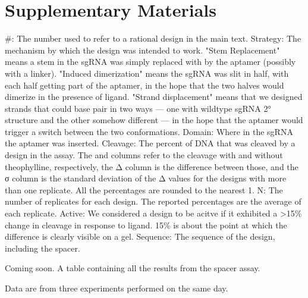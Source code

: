 \documentclass[10pt,oneside]{article}
\begin{document}
\section{Supplementary Materials}



    \#: The number used to refer to a rational design in the main text.
    Strategy: The mechanism by which the design was intended to work.  "Stem Replacement" means a stem in the sgRNA was simply replaced with by the aptamer (possibly with a linker).  "Induced dimerization" means the sgRNA was slit in half, with each half getting part of the aptamer, in the hope that the two halves would dimerize in the presence of ligand.  "Strand displacement" means that we designed strands that could base pair in two ways --- one with wildtype sgRNA 2° structure and the other somehow different --- in the hope that the aptamer would trigger a switch between the two conformations.
    Domain: Where in the sgRNA the aptamer was inserted.  
    Cleavage: The percent of DNA that was cleaved by a design in the \invitro{} assay.  The \apo{} and \holo{} columns refer to the cleavage with and without theophylline, respectively, the Δ column is the difference between those, and the σ column is the standard deviation of the Δ values for the designs with more than one replicate.  All the percentages are rounded to the nearest 1.
    N: The number of replicates for each design.  The reported percentages are the average of each replicate.
    Active: We considered a design to be acitve if it exhibited a >15\% change in cleavage in response to ligand.  15\% is about the point at which the difference is clearly visible on a gel.
    Sequence: The sequence of the design, including the spacer.





    Coming soon.  A table containing all the results from the spacer assay.  



      Data are from three experiments performed on the same day.
\end{document}
